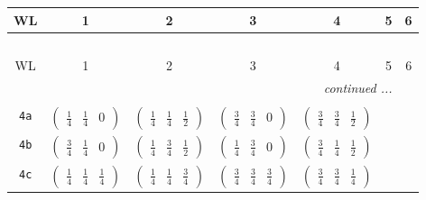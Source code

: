 \documentclass[fleqn,9pt,landscape]{jsarticle}
\begin{document}
\begin{center}
\renewcommand{\arraystretch}{1.2}
\begin{longtable}{ccccccc}
 \hline \hline
WL & 1 & 2 & 3 & 4 & 5 & 6 \\ \hline \endfirsthead

\multicolumn{6}{l}{\tablename\ \thetable{}} \\
 \hline \hline
WL & 1 & 2 & 3 & 4 & 5 & 6 \\ \hline \endhead

 \hline \hline
\multicolumn{6}{r}{\footnotesize\it continued ...} \\ \endfoot

 \hline \hline
\multicolumn{6}{r}{} \\ \endlastfoot

{\tt 4a} & $ \begin{pmatrix} \frac{1}{4} & \frac{1}{4} & 0 \end{pmatrix} $ & $ \begin{pmatrix} \frac{1}{4} & \frac{1}{4} & \frac{1}{2} \end{pmatrix} $ & $ \begin{pmatrix} \frac{3}{4} & \frac{3}{4} & 0 \end{pmatrix} $ & $ \begin{pmatrix} \frac{3}{4} & \frac{3}{4} & \frac{1}{2} \end{pmatrix} $ & $  $ & $  $ \\ \hline
{\tt 4b} & $ \begin{pmatrix} \frac{3}{4} & \frac{1}{4} & 0 \end{pmatrix} $ & $ \begin{pmatrix} \frac{1}{4} & \frac{3}{4} & \frac{1}{2} \end{pmatrix} $ & $ \begin{pmatrix} \frac{1}{4} & \frac{3}{4} & 0 \end{pmatrix} $ & $ \begin{pmatrix} \frac{3}{4} & \frac{1}{4} & \frac{1}{2} \end{pmatrix} $ & $  $ & $  $ \\ \hline
{\tt 4c} & $ \begin{pmatrix} \frac{1}{4} & \frac{1}{4} & \frac{1}{4} \end{pmatrix} $ & $ \begin{pmatrix} \frac{1}{4} & \frac{1}{4} & \frac{3}{4} \end{pmatrix} $ & $ \begin{pmatrix} \frac{3}{4} & \frac{3}{4} & \frac{3}{4} \end{pmatrix} $ & $ \begin{pmatrix} \frac{3}{4} & \frac{3}{4} & \frac{1}{4} \end{pmatrix} $ & $  $ & $  $ \\ \hline

\end{longtable}
\end{center}
\end{document}
